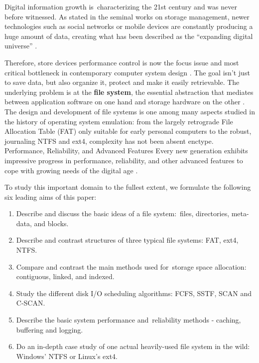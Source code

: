 \documentclass[12pt]{article}
\begin{document}
Digital information growth is characterizing the 21st century and was never before witnessed. As stated in the seminal works on storage management, newer technologies such as social networks or mobile devices are constantly producing a huge amount of data, creating what has been described as the ``expanding digital universe'' \parencite{EMC2012InformationStorage}.

Therefore, store devices performance control is now the focus issue and most critical bottleneck in contemporary computer system design \parencite{Pokharel2021}. The goal isn’t just to save data, but also organize it, protect and make it easily retrievable. The underlying problem is at the \textbf{file system}, the essential abstraction that mediates between application software on one hand and storage hardware on the other \parencite{Silberschatz2018}. The design and development of file systems is one among many aspects studied in the history of operating system emulation: from the largely retrograde File Allocation Table (FAT) only suitable for early personal computers to the robust, journaling NTFS and ext4, complexity has not been absent enctype. Performance, Reliability, and Advanced Features Every new generation exhibits impressive progress in performance, reliability, and other advanced features to cope with growing needs of the digital age \parencite{Tanenbaum2014}.




To study this important domain to the fullest extent, we formulate the following six leading aims of this paper:

\begin{enumerate}

  \item Describe and discuss the basic ideas of a file system: files, directories, meta-data, and blocks.

  \item Describe and contrast structures of three typical file systems: FAT, ext4, NTFS.

  \item Compare and contrast the main methods used for storage space allocation: contiguous, linked, and indexed.

  \item Study the different disk I/O scheduling algorithms: FCFS, SSTF, SCAN and C-SCAN.

  \item Describe the basic system performance and reliability methods - caching, buffering and logging.

  \item Do an in-depth case study of one actual heavily-used file system in the wild: Windows’ NTFS or Linux’s ext4.

\end{enumerate}
\end{document}
